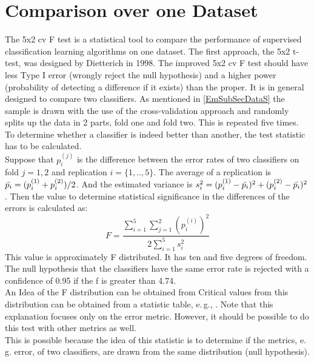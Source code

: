 \section{Comparison over one Dataset}\label{EmSecOneData}
The 5x2 cv F test is a statistical tool to compare the performance of supervised classification learning algorithms on one dataset.\cite{Chen.2009}
The first approach, the 5x2 t-test, was designed by Dietterich in 1998. \cite{Dietterich.1998}
The improved 5x2 cv F test should have less Type I error (wrongly reject the null hypothesis) and a higher power (probability of detecting a difference if it exists) than the proper.\cite{Alpaydm.1999}
It is in general designed to compare two classifiers.
As mentioned in \ref{EmSubSecDataS} the sample is drawn with the use of the cross-validation approach and randomly splits up the data in 2 parts, fold one and fold two.
This is repeated five times. 
To determine whether a classifier is indeed better than another, the test statistic has to be calculated.\\
Suppose that $p_i^{(j)}$ is the difference between the error rates of two classifiers on fold $j = 1,2$ and replication $i=\{1,..,5\}$.
The average of a replication is $\bar{p_i} = (p_i^{(1)}+p_i^{(2)})/2$.
And the estimated variance is $s_i^2=(p_i^{(1)}-\bar{p_i})^2+(p_i^{(2)}-\bar{p_i})^2$.
Then the value to determine statistical significance in the differences of the errors is calculated as:
\begin{equation}
	F = \frac{\sum_{i=1}^{5}\sum_{j=1}^{2}(p_i^{(i)})^2}{2\sum_{i=1}^{5}s_i^2}
\end{equation}
This value is approximately F distributed. It has ten and five degrees of freedom.
The null hypothesis that the classifiers have the same error rate is rejected with a confidence of 0.95 if the f is greater than 4.74. \\
An Idea of the F distribution can be obtained from \cite[p. 338-340]{Teschl.2014}
Critical values from this distribution can be obtained from a statistic table, e.\,g., \cite[p. 591]{Bortz.2010}.
Note that this explanation focuses only on the error metric.
However, it should be possible to do this test with other metrics as well.\\
This is possible because the idea of this statistic is to determine if the metrics, e.\,g. error, of two classifiers, are drawn from the same distribution (null hypothesis).\cite{Alpaydm.1999}

